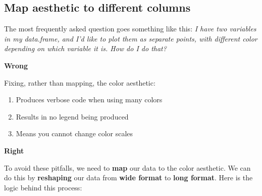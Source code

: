 \documentclass[
]{book}
\newenvironment{Shaded}{\begin{snugshade}}{\end{snugshade}}
\newcommand{\DataTypeTok}[1]{\textcolor[rgb]{0.13,0.29,0.53}{#1}}
\newcommand{\KeywordTok}[1]{\textcolor[rgb]{0.13,0.29,0.53}{\textbf{#1}}}
\newcommand{\NormalTok}[1]{#1}
\newcommand{\OperatorTok}[1]{\textcolor[rgb]{0.81,0.36,0.00}{\textbf{#1}}}
\newcommand{\StringTok}[1]{\textcolor[rgb]{0.31,0.60,0.02}{#1}}
\providecommand{\tightlist}{%
  \setlength{\itemsep}{0pt}\setlength{\parskip}{0pt}}
\begin{document}
\hypertarget{map-aesthetic-to-different-columns}{%
\subsection{Map aesthetic to different columns}\label{map-aesthetic-to-different-columns}}

The most frequently asked question goes something like this: \emph{I have two variables in my data.frame, and I'd like to plot them as separate points, with different color depending on which variable it is. How do I do that?}

\textbf{Wrong}

Fixing, rather than mapping, the color aesthetic:

\begin{enumerate}
\def\labelenumi{\arabic{enumi}.}
\tightlist
\item
  Produces verbose code when using many colors
\item
  Results in no legend being produced
\item
  Means you cannot change color scales
\end{enumerate}

\begin{Shaded}
\end{Shaded}

\textbf{Right}

To avoid these pitfalls, we need to \textbf{map} our data to the color aesthetic.
We can do this by \textbf{reshaping} our data from \textbf{wide format} to \textbf{long format}.
Here is the logic behind this process:
\end{document}
